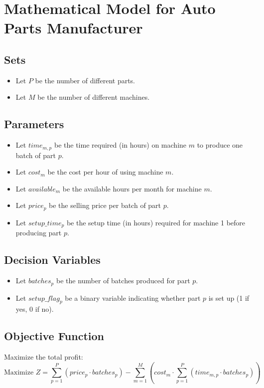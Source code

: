 \documentclass{article}
\begin{document}
\section*{Mathematical Model for Auto Parts Manufacturer}

\subsection*{Sets}
\begin{itemize}
    \item Let \( P \) be the number of different parts.
    \item Let \( M \) be the number of different machines.
\end{itemize}

\subsection*{Parameters}
\begin{itemize}
    \item Let \( time_{m,p} \) be the time required (in hours) on machine \( m \) to produce one batch of part \( p \).
    \item Let \( cost_{m} \) be the cost per hour of using machine \( m \).
    \item Let \( available_{m} \) be the available hours per month for machine \( m \).
    \item Let \( price_{p} \) be the selling price per batch of part \( p \).
    \item Let \( setup\_time_{p} \) be the setup time (in hours) required for machine 1 before producing part \( p \).
\end{itemize}

\subsection*{Decision Variables}
\begin{itemize}
    \item Let \( batches_{p} \) be the number of batches produced for part \( p \).
    \item Let \( setup\_flag_{p} \) be a binary variable indicating whether part \( p \) is set up (1 if yes, 0 if no).
\end{itemize}

\subsection*{Objective Function}
Maximize the total profit:
\[
\text{Maximize } Z = \sum_{p=1}^{P} (price_{p} \cdot batches_{p}) - \sum_{m=1}^{M} \left( cost_{m} \cdot \sum_{p=1}^{P} (time_{m,p} \cdot batches_{p}) \right)
\]
\end{document}
